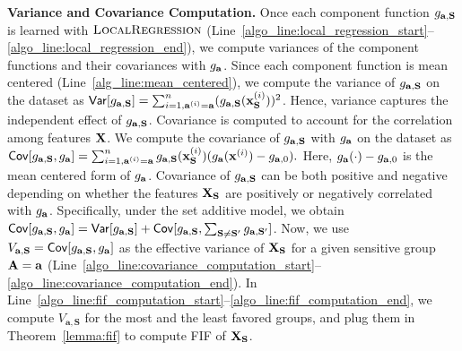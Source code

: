 \noindent\textbf{Variance and Covariance Computation.} Once each component function $ g_{\mathbf{a}, \mathbf{S}} $ is learned with $ \textsc{LocalRegression} $ (Line~\ref{algo_line:local_regression_start}--\ref{algo_line:local_regression_end}), we compute variances of the component functions and their covariances with $ g_{\mathbf{a}} $. Since each component function is mean centered (Line~\ref{alg_line:mean_centered}), we compute the variance of $ g_{\mathbf{a}, \mathbf{S}} $ on the dataset as
$  \mathsf{Var}[g_{\mathbf{a}, \mathbf{S}}] = \sum_{i=1, \mathbf{a}^{(i)} = \mathbf{a}}^n (g_{\mathbf{a}, \mathbf{S}}(\mathbf{x}_{\mathbf{S}}^{(i)}))^2 $. Hence, variance captures the independent effect of $ g_{\mathbf{a}, \mathbf{S}} $.
Covariance is computed to account for the correlation among features $ \mathbf{X} $. We compute the covariance of $ g_{\mathbf{a}, \mathbf{S}} $ with $ g_{\mathbf{a}} $ on the dataset as
$
\label{eq:covariance_computation}
	 \mathsf{Cov}[g_{\mathbf{a}, \mathbf{S}}, g_{\mathbf{a}}] = \sum_{i=1, \mathbf{a}^{(i)} = \mathbf{a}}^n g_{\mathbf{a}, \mathbf{S}}(\mathbf{x}_{\mathbf{S}}^{(i)})(g_\mathbf{a}(\mathbf{x}^{(i)}) - g_{\mathbf{a}, 0}). 
$
Here, $ g_\mathbf{a}(\cdot) - g_{\mathbf{a}, 0} $ is the mean centered form of $ g_{\mathbf{a}} $. Covariance of $ g_{\mathbf{a}, \mathbf{S}} $ can be both positive and negative depending on whether the features $ \mathbf{X}_{\mathbf{S}} $ are positively or negatively correlated with $ g_{\mathbf{a}} $. Specifically, under the set additive model, we obtain $ \mathsf{Cov}[g_{\mathbf{a}, \mathbf{S}}, g_{\mathbf{a}}] = \mathsf{Var}[g_{\mathbf{a}, \mathbf{S}}] + \mathsf{Cov}[g_{\mathbf{a}, \mathbf{S}}, \sum_{\mathbf{S} \ne \mathbf{S}'} g_{\mathbf{a}, \mathbf{S}'}] $. Now, we use $ V_{\mathbf{a}, \mathbf{S}} =  \mathsf{Cov}[g_{\mathbf{a}, \mathbf{S}}, g_{\mathbf{a}}] $ as the effective variance of $ \mathbf{X}_{\mathbf{S}} $ for a given sensitive group $ \mathbf{A} = \mathbf{a} $ (Line~\ref{algo_line:covariance_computation_start}--\ref{algo_line:covariance_computation_end}). In Line~\ref{algo_line:fif_computation_start}--\ref{algo_line:fif_computation_end}, we compute $ V_{\mathbf{a}, \mathbf{S}} $ for the most and the least favored groups, and plug them in Theorem~\ref{lemma:fif} to compute FIF of $ \mathbf{X}_{\mathbf{S}} $.
 
